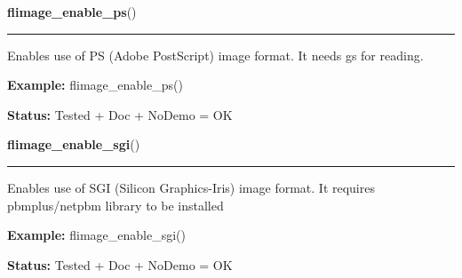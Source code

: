 \hspace{.8\funcindent}\begin{boxedminipage}{\funcwidth}

    \raggedright \textbf{flimage\_enable\_ps}()

    \vspace{-1.5ex}

    \rule{\textwidth}{0.5\fboxrule}
\setlength{\parskip}{2ex}
    Enables use of PS (Adobe PostScript) image format. It needs gs for 
    reading.

\setlength{\parskip}{1ex}
\textbf{Example:} flimage\_enable\_ps()



\textbf{Status:} Tested + Doc + NoDemo = OK



    \end{boxedminipage}

    \label{xformslib:flflimage:flimage_enable_sgi}

    \vspace{0.5ex}

\hspace{.8\funcindent}\begin{boxedminipage}{\funcwidth}

    \raggedright \textbf{flimage\_enable\_sgi}()

    \vspace{-1.5ex}

    \rule{\textwidth}{0.5\fboxrule}
\setlength{\parskip}{2ex}
    Enables use of SGI (Silicon Graphics-Iris) image format. It requires 
    pbmplus/netpbm library to be installed

\setlength{\parskip}{1ex}
\textbf{Example:} flimage\_enable\_sgi()



\textbf{Status:} Tested + Doc + NoDemo = OK



    \end{boxedminipage}

    \label{xformslib:flflimage:flimage_enable_tiff}

    \vspace{0.5ex}

